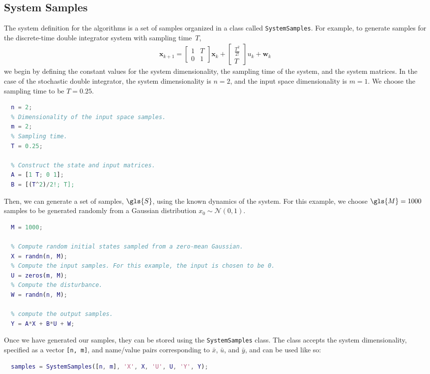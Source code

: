 \documentclass[11pt]{article}
\begin{document}

\subsection{System Samples}

The system definition for the algorithms is a set of samples organized in a class called \verb|SystemSamples|.
For example, to generate samples for the discrete-time double integrator system
with sampling time~$T$,
\begin{align}
  \boldsymbol{x}_{k+1} =
  \begin{bmatrix}
    1 & T \\
    0 & 1
  \end{bmatrix}
  \boldsymbol{x}_{k} +
  \begin{bmatrix}
    \frac{T^{2}}{2!} \\
    T
  \end{bmatrix}
  u_{k} +
  \boldsymbol{w}_{k}
\end{align}
we begin by defining the constant values for the system dimensionality, the sampling time of the system, and the system matrices. In the case of the stochastic double integrator, the system dimensionality is $n = 2$, and the input space dimensionality is $m = 1$. We choose the sampling time to be $T = 0.25$.
\begin{lstlisting}[language=Matlab]
  % Dimensionality of the state space samples.
  n = 2;
  % Dimensionality of the input space samples.
  m = 2;
  % Sampling time.
  T = 0.25;

  % Construct the state and input matrices.
  A = [1 T; 0 1];
  B = [(T^2)/2!; T];
\end{lstlisting}
Then, we can generate a set of samples, $\gls{S}$, using the known dynamics of the system. For this example, we choose $\gls{M} = 1000$ samples to be generated randomly from a Gaussian distribution $x_{0} \sim \mathcal{N}(0, 1)$.
\begin{lstlisting}[language=Matlab, firstnumber=last]
  % Number of samples.
  M = 1000;

  % Compute random initial states sampled from a zero-mean Gaussian.
  X = randn(n, M);
  % Compute the input samples. For this example, the input is chosen to be 0.
  U = zeros(m, M);
  % Compute the disturbance.
  W = randn(n, M);

  % compute the output samples.
  Y = A*X + B*U + W;
\end{lstlisting}
Once we have generated our samples, they can be stored using the \verb|SystemSamples| class. The class accepts the system dimensionality, specified as a vector \verb|[n, m]|, and name/value pairs corresponding to $\bar{x}$, $\bar{u}$, and $\bar{y}$, and can be used like so:
\begin{lstlisting}[language=Matlab, firstnumber=last]
  % Create a SystemSamples object.
  samples = SystemSamples([n, m], 'X', X, 'U', U, 'Y', Y);
\end{lstlisting}
\end{document}
